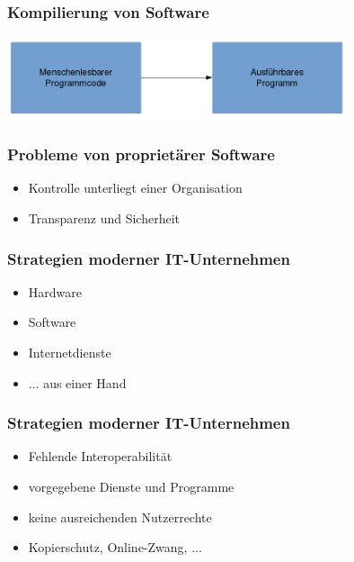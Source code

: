 \documentclass[12pt]{beamer}
\begin{document}
\subsection{}

\begin{frame}
  \frametitle{Kompilierung von Software}
  \begin{center}
    \includegraphics[width=10cm]{img/compilation-process}
  \par\end{center}
\end{frame}

\begin{frame}
  \frametitle{Probleme von proprietärer Software}
  \begin{itemize}
    \item<2-> Kontrolle unterliegt einer Organisation
    \item<3-> Transparenz und Sicherheit
  \end{itemize}
\end{frame}

\begin{frame}
  \frametitle{Strategien moderner IT-Unternehmen}
  \begin{itemize}
    \item<2-> Hardware
    \item<3-> Software
    \item<4-> Internetdienste
    \item<5-> ... aus einer Hand
  \end{itemize}
\end{frame}

\begin{frame}
  \frametitle{Strategien moderner IT-Unternehmen}
  \begin{itemize}
    \item<2-> Fehlende Interoperabilität
    \item<3-> vorgegebene Dienste und Programme
    \item<4-> keine ausreichenden Nutzerrechte
    \item<5-> Kopierschutz, Online-Zwang, ...
  \end{itemize}
\end{frame}
\end{document}
